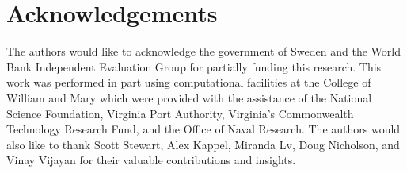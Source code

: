 \documentclass{article}\usepackage[]{graphicx}\usepackage[]{color}
\newenvironment{knitrout}{}{}  %
\begin{document}
\begin{knitrout}
\section{Acknowledgements}
The authors would like to acknowledge the government of Sweden and the World Bank Independent Evaluation Group for partially funding this research.  This work was performed in part using computational facilities at the College of William and Mary which were provided with the assistance of the National Science Foundation, Virginia Port Authority, Virginia's Commonwealth Technology Research Fund, and the Office of Naval Research.  The authors would also like to thank Scott Stewart, Alex Kappel, Miranda Lv, Doug Nicholson, and Vinay Vijayan for their valuable contributions and insights.


\newpage
\printbibliography



\end{knitrout}
\end{document}
